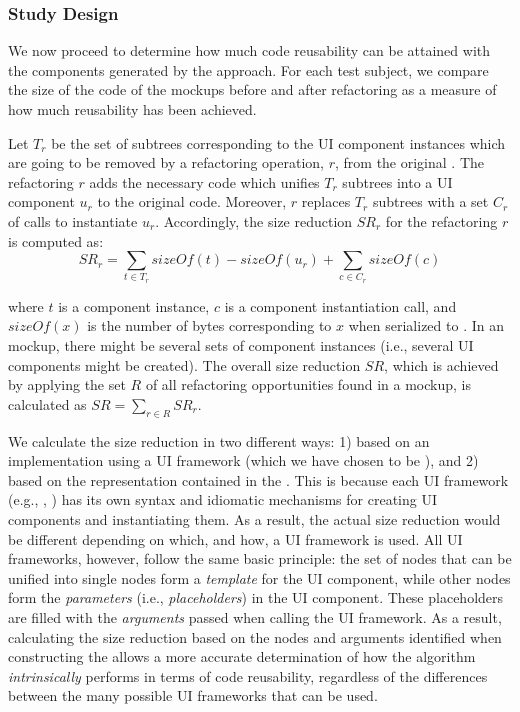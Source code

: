 \subsubsection{Study Design}

We now proceed to determine how much code reusability can be attained with the components generated by the approach. For each test subject, we compare the size of the \html code of the mockups before and after refactoring as a measure of how much reusability has been achieved.

Let $T_r$ be the set of \dom subtrees corresponding to the UI component instances
which are going to be removed by a refactoring operation, $r$, from the original \html.
The refactoring $r$ adds the necessary code
which unifies $T_r$ subtrees into a UI component $u_r$
to the original \html code.
Moreover, $r$ replaces $T_r$ subtrees with a set $C_r$ of calls to instantiate $u_r$.
Accordingly, the size reduction $SR_r$ for the refactoring $r$ is computed as:
\begin{equation}
SR_r = \sum\limits_{t \in T_r}{sizeOf(t)} - sizeOf(u_r) + \sum\limits_{c \in C_r}{sizeOf(c)}
\end{equation}

\noindent 
where $t$ is a component instance, $c$ is a component instantiation call, and $sizeOf(x)$ is the number of bytes corresponding to $x$
when serialized to \html. 
In an \html mockup, there might be several 
sets of component instances
(i.e., several UI components might be created).
The overall size reduction $SR$, which is achieved by applying 
the set $R$ of all refactoring opportunities
found in a mockup, is calculated as {\footnotesize$SR = \sum\limits_{r \in R}{SR_r}$}.

We calculate the size reduction in two different ways:
1) based on an implementation using a UI framework (which we have chosen to be \react),
and 
2) based on the representation contained in the \model.
This is because each UI framework (e.g., \react, \angular) has its own syntax and idiomatic mechanisms 
for creating UI components and instantiating them.
As a result, the actual size reduction would be different depending on which, and how, a UI framework is used.
All UI frameworks, however, follow the same basic principle:
the set of \dom nodes that can be unified into single \dom nodes
form a \textit{template} for the UI component, 
while other nodes form the \textit{parameters} (i.e., \textit{placeholders}) in the UI component.
These placeholders are filled with the \textit{arguments} passed when calling the UI framework.
As a result, calculating the size reduction based on the nodes
and arguments identified when constructing the \model
allows a more accurate determination of how the algorithm \emph{intrinsically} performs
in terms of code reusability,
regardless of the differences between the many possible UI frameworks that can be used.

